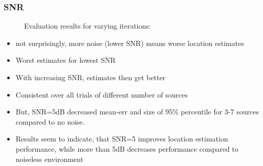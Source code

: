 \subsubsection{SNR}
%	       
%	       

\begin{figure}[H]
    \setlength\figureheight{7cm}
    \small
    \setlength\figurewidth{\textwidth}
	\centering
	\begin{tikzpicture}
	    \footnotesize
	    
	    
	\end{tikzpicture}
	
	\caption[Evaluation results for varying  iterations]{Evaluation results for varying  iterations: }
	\label{fig:trial1}
\end{figure}

\begin{itemize}
    \item not surprisingly, more noise (lower SNR) means worse location estimates
    \item Worst estimates for lowest SNR
    \item With increasing SNR, estimates then get better
    \item Consistent over all trials of different number of sources
    \item But, SNR=5dB decreased mean-err and size of 95\% percentile for 3-7 sources compared to no noise.
    \item Results seem to indicate, that SNR=5 improves location estimation performance, while more than 5dB decreases performance compared to noiseless environment
\end{itemize}